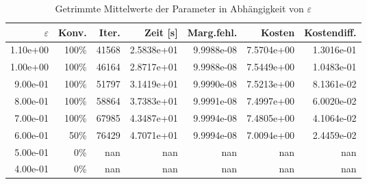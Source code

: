 \begin{table}[htbp]
\caption{Getrimmte Mittelwerte der Parameter in Abhängigkeit von $\varepsilon$}
\label{tab:Parametertest1024_1}
\small
\centering
{}
\begin{tabular}{rrrrrrr}
\toprule
$\varepsilon$ & Konv. & Iter. & Zeit [s] & Marg.fehl. & Kosten & Kostendiff. \\
\midrule
1.10e+00 & 100\% & 41568 & 2.5838e+01 & 9.9988e-08 & 7.5704e+00 & 1.3016e-01 \\
1.00e+00 & 100\% & 46164 & 2.8717e+01 & 9.9988e-08 & 7.5449e+00 & 1.0483e-01 \\
9.00e-01 & 100\% & 51797 & 3.1419e+01 & 9.9990e-08 & 7.5213e+00 & 8.1361e-02 \\
8.00e-01 & 100\% & 58864 & 3.7383e+01 & 9.9991e-08 & 7.4997e+00 & 6.0020e-02 \\
7.00e-01 & 100\% & 67985 & 4.3487e+01 & 9.9994e-08 & 7.4805e+00 & 4.1064e-02 \\
6.00e-01 & 50\% & 76429 & 4.7071e+01 & 9.9994e-08 & 7.0094e+00 & 2.4459e-02 \\
5.00e-01 & 0\% & nan & nan & nan & nan & nan \\
4.00e-01 & 0\% & nan & nan & nan & nan & nan \\
\bottomrule
\end{tabular}
\end{table}

